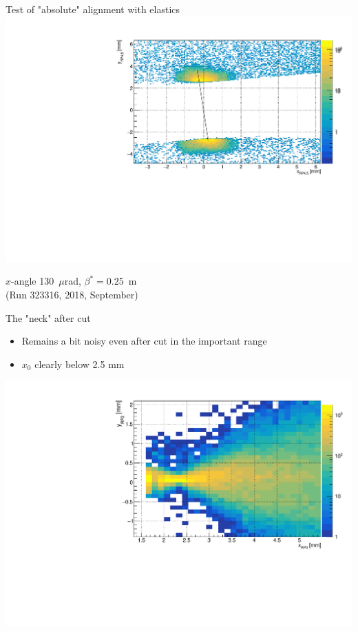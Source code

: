 \documentclass{beamer}
\begin{document}
\begin{frame}\scriptsize
	\begin{block}{Test of "absolute" alignment with elastics}
             \includegraphics[width=1.0\textwidth]{elastic.pdf}
	\end{block}
	
\end{frame}

\begin{frame}
	\begin{center}
	\Large
	$x$-angle 130~$\mu$rad, $\beta^{*}=0.25$~m \\ {\small (Run 323316, 2018, September)}
	\end{center}
\end{frame}


\begin{frame}\scriptsize
	\begin{block}{The "neck" after cut}
    		\begin{itemize}
			\item Remains a bit noisy even after cut in the important range
			\item $x_{0}$ clearly below 2.5 mm
		\end{itemize}
             \includegraphics[width=1.0\textwidth]{Run_323316_130_murad_beta_star_0p25_m_neck.pdf}\\
	\end{block}
	
\end{frame}
\end{document}
